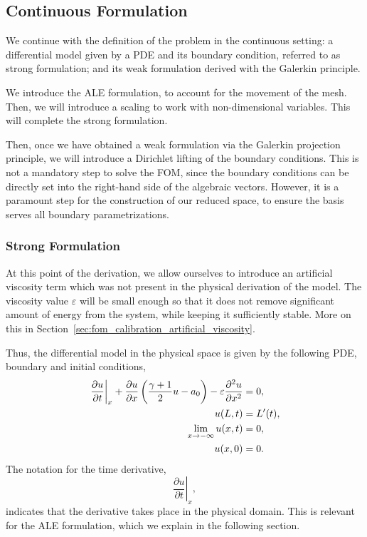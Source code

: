 \documentclass[../../thesis.tex]{subfiles}
\begin{document}
\subsection{Continuous Formulation}
We continue with the definition of the problem in the continuous setting: 
a differential model given by a PDE and its boundary condition, referred to as {strong formulation}; 
and its weak formulation derived with the Galerkin principle.

We introduce the ALE formulation, to account for the movement of the mesh.
Then, we will introduce a scaling to work with non-dimensional variables.
This will complete the strong formulation.

Then, once we have obtained a weak formulation via the Galerkin projection principle,
we will introduce a Dirichlet lifting of the boundary conditions.
This is not a mandatory step to solve the FOM, 
since the boundary conditions can be directly set into the right-hand side of the algebraic vectors.
However, it is a paramount step for the construction of our reduced space,
to ensure the basis serves all boundary parametrizations.

\subsubsection{Strong Formulation}
At this point of the derivation, we allow ourselves to introduce an artificial viscosity term which was not present in the physical derivation of the model.
The viscosity value $\varepsilon$ will be small enough so that it does not remove 
significant amount of energy from the system, while keeping it sufficiently stable. 
More on this in Section~\ref{sec:fom_calibration_artificial_viscosity}.

Thus, the differential model in the physical space is given by the following PDE, boundary and initial conditions,
\begin{subequations}
    \begin{align}
        \left.\frac{\partial u}{\partial t}\right|_{x} 
        + \frac{\partial u}{\partial x}\left(\frac{\gamma+1}{2}u - a_0\right) 
        - \varepsilon \pdv[2]{u}{x} &= 0, \label{eq:1d_fom_strong_pde} \\
        u(L, t) &= L'(t),
        \\
        \lim_{x\rightarrow-\infty}u(x,t) &= 0,
        \label{eq:rest_condition_at_infinity}
        \\
        u(x, 0) &= 0. 
    \end{align}
\end{subequations}
The notation for the time derivative,
\begin{equation*}
    \left.\frac{\partial u}{\partial t}\right|_{x},
\end{equation*}
indicates that the derivative takes place in the physical domain. 
This is relevant for the ALE formulation, which we explain in the following section.
\end{document}
